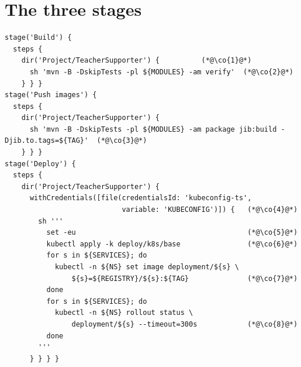 \section{The three stages}

\begin{lstlisting}
stage('Build') {
  steps {
    dir('Project/TeacherSupporter') {          (*@\co{1}@*)
      sh 'mvn -B -DskipTests -pl ${MODULES} -am verify'  (*@\co{2}@*)
    } } }
stage('Push images') {
  steps {
    dir('Project/TeacherSupporter') {
      sh 'mvn -B -DskipTests -pl ${MODULES} -am package jib:build -Djib.to.tags=${TAG}'  (*@\co{3}@*)
    } } }
stage('Deploy') {
  steps {
    dir('Project/TeacherSupporter') {
      withCredentials([file(credentialsId: 'kubeconfig-ts',
                            variable: 'KUBECONFIG')]) {   (*@\co{4}@*)
        sh '''
          set -eu                                         (*@\co{5}@*)
          kubectl apply -k deploy/k8s/base                (*@\co{6}@*)
          for s in ${SERVICES}; do
            kubectl -n ${NS} set image deployment/${s} \
                ${s}=${REGISTRY}/${s}:${TAG}              (*@\co{7}@*)
          done
          for s in ${SERVICES}; do
            kubectl -n ${NS} rollout status \
                deployment/${s} --timeout=300s            (*@\co{8}@*)
          done
        '''
      } } } }
\end{lstlisting}

